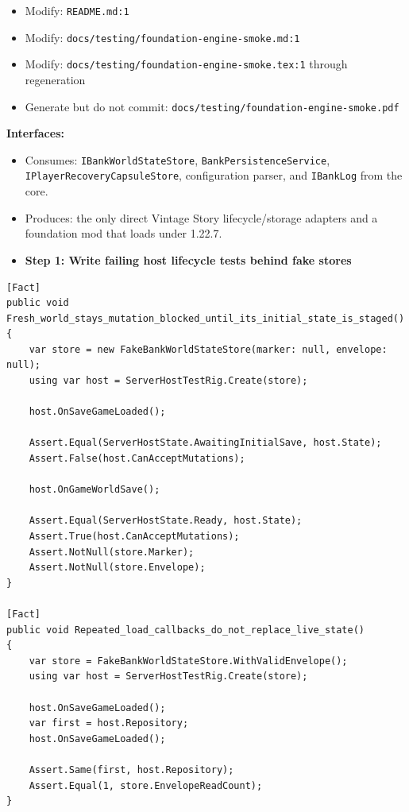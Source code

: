\documentclass[
  10pt,
  letterpaper,
]{article}
\newcommand{\passthrough}[1]{#1}
\providecommand{\tightlist}{%
  \setlength{\itemsep}{0pt}\setlength{\parskip}{0pt}}
\begin{document}
\begin{itemize}
\item
  Modify: \passthrough{\lstinline!README.md:1!}
\item
  Modify:
  \texttt{docs/}\allowbreak{}\texttt{testing/}\allowbreak{}\texttt{foundation-}\allowbreak{}\texttt{engine-}\allowbreak{}\texttt{smoke.}\allowbreak{}\texttt{md:}\allowbreak{}\texttt{1}
\item
  Modify:
  \texttt{docs/}\allowbreak{}\texttt{testing/}\allowbreak{}\texttt{foundation-}\allowbreak{}\texttt{engine-}\allowbreak{}\texttt{smoke.}\allowbreak{}\texttt{tex:}\allowbreak{}\texttt{1}
  through regeneration
\item
  Generate but do not commit:
  \texttt{docs/}\allowbreak{}\texttt{testing/}\allowbreak{}\texttt{foundation-}\allowbreak{}\texttt{engine-}\allowbreak{}\texttt{smoke.}\allowbreak{}\texttt{pdf}
\end{itemize}

\textbf{Interfaces:}

\begin{itemize}
\tightlist
\item
  Consumes: \passthrough{\lstinline!IBankWorldStateStore!},
  \passthrough{\lstinline!BankPersistenceService!},
  \texttt{IPlayerRecoveryCapsuleStore}, configuration parser, and
  \passthrough{\lstinline!IBankLog!} from the core.
\item
  Produces: the only direct Vintage Story lifecycle/storage adapters and
  a foundation mod that loads under 1.22.7.
\end{itemize}

\begin{itemize}
\tightlist
\item[$\square$]
  \textbf{Step 1: Write failing host lifecycle tests behind fake stores}
\end{itemize}

\begin{lstlisting}
[Fact]
public void Fresh_world_stays_mutation_blocked_until_its_initial_state_is_staged()
{
    var store = new FakeBankWorldStateStore(marker: null, envelope: null);
    using var host = ServerHostTestRig.Create(store);

    host.OnSaveGameLoaded();

    Assert.Equal(ServerHostState.AwaitingInitialSave, host.State);
    Assert.False(host.CanAcceptMutations);

    host.OnGameWorldSave();

    Assert.Equal(ServerHostState.Ready, host.State);
    Assert.True(host.CanAcceptMutations);
    Assert.NotNull(store.Marker);
    Assert.NotNull(store.Envelope);
}

[Fact]
public void Repeated_load_callbacks_do_not_replace_live_state()
{
    var store = FakeBankWorldStateStore.WithValidEnvelope();
    using var host = ServerHostTestRig.Create(store);

    host.OnSaveGameLoaded();
    var first = host.Repository;
    host.OnSaveGameLoaded();

    Assert.Same(first, host.Repository);
    Assert.Equal(1, store.EnvelopeReadCount);
}
\end{lstlisting}
\end{document}
